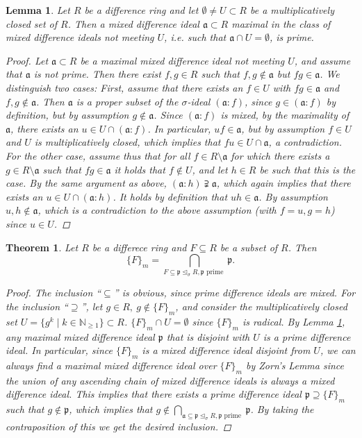 \documentclass{article}
\def\NE{\mathbb{N}_{\geq1}}
\def\a{\mathfrak{a}}
\def\p{\mathfrak{p}}
\def\s{\sigma}
\def\si{\unlhd_{\sigma}}
\newenvironment{bew}{\begin{proof}[Proof]}{\end{proof}}
\theoremstyle{plain}
\newtheorem{theorem}[Satz]{Theorem}
\newtheorem{lem}[Satz]{Lemma}
\theoremstyle{definition}
\begin{document}
\begin{lem}\label{maxmixed=prime}
Let $R$ be a difference ring and let $\emptyset \neq U \subset R$ be a multiplicatively closed set of $R$. Then a mixed difference ideal $\a \subset R$ maximal in the class of mixed difference
ideals not meeting $U$, i.e. such that $\a \cap U = \emptyset$, is prime. 
\begin{bew}
Let $\a \subset R$ be a maximal mixed difference ideal not meeting $U$, and assume that $\a$ is not prime. Then there exist $f, g \in R$ such that $f,g \notin \a$ but $fg \in \a$.
We distinguish two cases: First, assume that there exists an $f \in U$ with $fg \in \a$ and $f, g \notin \a$. Then $\a$ is a proper subset of the $\s$-ideal $(\a:f)$, since $g \in (\a:f)$ by definition, but by assumption $g \notin \a$.
Since $(\a:f)$ is mixed, by the maximality of $\a$, there exists an $u \in U \cap (\a:f)$. In particular, $uf \in \a$, but by assumption $f \in U$ and $U$ is multiplicatively closed, which implies that $fu \in U \cap \a$, a contradiction. \\
For the other case, assume thus that for all $f \in R \setminus \a$ for which there exists a $g \in R \setminus \a$ such that $fg \in \a$ it holds that $f \notin U$, and let $h \in R$ be such that this is the case.
By the same argument as above, $(\a:h) \supsetneqq \a$, which again implies that there exists an $u \in U \cap (\a:h)$. It holds by definition that $uh \in \a$. By assumption $u,h \notin \a$, which is a contradiction to the above assumption (with $f = u, g = h$) since $u \in U$. 
\end{bew}
\end{lem}

\begin{theorem}
Let $R$ be a differece ring and $F \subseteq R$ be a subset of $R$. Then
\[ \{ F \}_m = \bigcap_{F \subseteq \p \si R, \p \text{ prime }} \p.\]
\begin{proof}
The inclusion ``$\subseteq$'' is obvious, since prime difference ideals are mixed. For the inclusion ``$\supseteq$'', let $g \in R, ~ g \notin \{ F \}_m$, and consider the multiplicatively closed set $U = \{ g^k \mid k \in \NE \} \subset R$. 
$\{ F \}_m \cap U = \emptyset$ since $\{ F \}_m$ is radical. By Lemma \ref{maxmixed=prime}, any maximal mixed difference ideal $\p$ that is disjoint with $U$ is a prime difference ideal. In particular, since $\{F\}_m$ is a mixed difference ideal disjoint from $U$, we can always find a maximal mixed difference ideal over $\{F\}_m$ by Zorn's Lemma since
the union of any ascending chain of mixed difference ideals is always a mixed difference ideal. This implies that there exists a prime difference ideal $\p \supseteq \{F\}_m$ such that $g \notin \p$,
which implies that $g \notin \bigcap_{\a \subseteq \p \si R, \p \text{ prime }} \p$. By taking the contraposition of this we get the desired inclusion.
\end{proof}
\end{theorem}
\end{document}
